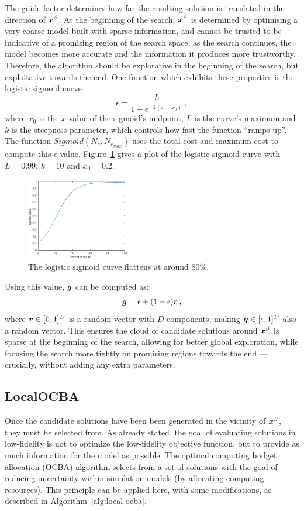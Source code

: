 \documentclass[journal]{IEEEtran}
\begin{document}
The guide factor determines how far the resulting solution is translated in the direction of $\boldsymbol{x}^\beta$. At the beginning of the search, $\boldsymbol{x}^\beta$ is determined by optimising a very coarse model built with sparse information, and cannot be trusted to be indicative of a promising region of the search space; as the search continues, the model becomes more accurate and the information it produces more trustworthy. Therefore, the algorithm should be explorative in the beginning of the search, but exploitative towards the end. One function which exhibits these properties is the logistic sigmoid curve
\begin{equation}
\epsilon = \dfrac{L}{1+e^{-k(x-x_0)}}\,,
\end{equation}
where $x_0$ is the $x$ value of the sigmoid's midpoint, $L$ is the curve's maximum and $k$ is the steepness parameter, which controls how fast the function ``ramps up''. The function $Sigmoid(N_e,N_{e_{max}})$ uses the total cost and maximum cost to compute this $\epsilon$ value. Figure~\ref{fig:logistic} gives a plot of the logistic sigmoid curve with $L=0.99$, $k=10$ and $x_0 = 0.2$. 
\begin{figure}[h!]
  \centering
  \includegraphics[width = 0.40\textwidth]{img/logistic.eps} 
  \caption{The logistic sigmoid curve flattens at around 80\%.} 
    \label{fig:logistic}
\end{figure}
Using this value, $\boldsymbol{g}$ can be computed as:
\begin{equation}
\boldsymbol{g} = \epsilon + (1-\epsilon)\boldsymbol{r}\,,
\end{equation}
where $\boldsymbol{r} \in [0,1]^D$ is a random vector with $D$ components, making $\boldsymbol{g} \in [\epsilon,1]^D$ also a random vector. This ensures the cloud of candidate solutions around $\boldsymbol{x}^\beta$ is sparse at the beginning of the search, allowing for better global exploration, while focusing the search more tightly on promising regions towards the end --- crucially, without adding any extra parameters. 

\subsection{LocalOCBA}\label{subsec:local}
Once the candidate solutions have been been generated in the vicinity of $\boldsymbol{x}^\beta$, they must be selected from. As already stated, the goal of evaluating solutions in low-fidelity is not to optimize the low-fidelity objective function, but to provide as much information for the model as possible. The optimal computing budget allocation (OCBA) algorithm selects from a set of solutions with the goal of reducing uncertainty within simulation models (by allocating computing resources). This principle can be applied here, with some modifications, as described in Algorithm~\ref{alg:local-ocba}.
\end{document}
